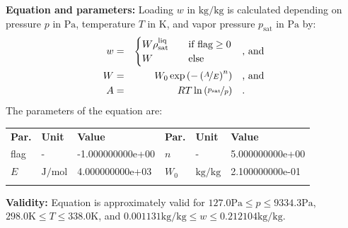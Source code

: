 \textbf{Equation and parameters:}
\newline
%
Loading $w$ in $\si{\kilogram\per\kilogram}$ is calculated depending on pressure $p$ in $\si{\pascal}$, temperature $T$ in $\si{\kelvin}$, and vapor pressure $p_\mathrm{sat}$ in $\si{\pascal}$ by:
%
\begin{equation*}
\begin{split}
w &=& \begin{cases} W \rho_\mathrm{sat}^{\mathrm{liq}} & \quad \text{if flag} \geq 0 \\ W & \quad \text{else} \end{cases} & \quad\text{, and} \\
W &=& W_0 \exp \left( - \left( \nicefrac{A}{E} \right) ^{n} \right) & \quad\text{, and} \\
A &=& R T \ln \left( \nicefrac{p_\mathrm{sat}}{p} \right) & \quad\text{.} \\
\end{split}
\end{equation*}
%
The parameters of the equation are:
%
\begin{longtable}[l]{lll|lll}
\toprule
\addlinespace
\textbf{Par.} & \textbf{Unit} & \textbf{Value} &	\textbf{Par.} & \textbf{Unit} & \textbf{Value} \\
\addlinespace
\midrule
\endhead

\bottomrule
\endfoot
\bottomrule
\endlastfoot
\addlinespace

flag & - & -1.000000000e+00 & $n$ & - & 5.000000000e+00 \\
$E$ & $\si{\joule\per\mole}$ & 4.000000000e+03 & $W_0$ & $\si{\kilogram\per\kilogram}$ & 2.100000000e-01 \\

\addlinespace\end{longtable}

\textbf{Validity:}
\newline
Equation is approximately valid for $127.0 \si{\pascal} \leq p \leq 9334.3 \si{\pascal}$,  $298.0 \si{\kelvin} \leq T \leq 338.0 \si{\kelvin}$, and $0.001131 \si{\kilogram\per\kilogram} \leq w \leq 0.212104 \si{\kilogram\per\kilogram}$.
\newline

